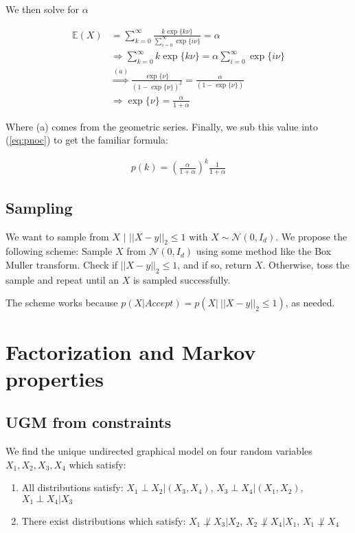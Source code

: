 \documentclass[paper=a4, fontsize=11pt]{scrartcl} %
\numberwithin{equation}{section} %
\numberwithin{figure}{section} %
\numberwithin{table}{section} %
\begin{document}
We then solve for $\alpha$

\begin{align*}
\mathbb{E}(X)&=\sum_{k=0}^{\infty}\frac{k\exp\{k\nu\}}{\sum_{i=0}^{\infty}\exp\{i\nu\}}=\alpha\\
&\Rightarrow \sum_{k=0}^{\infty}k\exp\{k\nu\}=\alpha\sum_{i=0}^{\infty}\exp\{i\nu\}\\
&\overset{(a)}{\Rightarrow} \frac{\exp\{\nu\}}{(1-\exp\{\nu\})^2} = \frac{\alpha}{(1-\exp\{\nu\})}\\
&\Rightarrow \exp\{\nu\} = \frac{\alpha}{1+\alpha}
\end{align*}

Where (a) comes from the geometric series. Finally, we sub this value into (\ref{eq:pnoc}) to get the familiar formula:

\begin{align}
p(k)=\left(\frac{\alpha}{1+\alpha}\right)^k\frac{1}{1+\alpha}
\end{align}

\subsection{Sampling}
We want to sample from $X$ $|$ $||X-y||_2 \le 1$ with $X\sim \mathcal{N}(0, I_d)$. We propose the following scheme: Sample $X$ from $\mathcal{N}(0, I_d)$ using some method like the Box Muller transform. Check if $||X-y||_2 \le 1$, and if so, return $X$. Otherwise, toss the sample and repeat until an $X$ is sampled successfully.

The scheme works because $p(X|Accept)=p(X|\ ||X-y||_2 \le 1)$, as needed.

\section{Factorization and Markov properties}

\subsection{UGM from constraints}
We find the unique undirected graphical model on four
random variables $X_1 , X_2 , X_3 , X_4$ which satisfy:
\begin{enumerate}
	\item All distributions satisfy: $X_1 \perp X_2 | (X_3, X_4)$, $X_3 \perp X_4 | (X_1, X_2)$, $X_1 \perp X_4 | X_3$
	\item There exist distributions which satisfy: $X_1 \not\perp X_3 | X_2$, $X_2 \not\perp X_4 | X_1$, $X_1 \not\perp X_4$
\end{enumerate}
\end{document}
